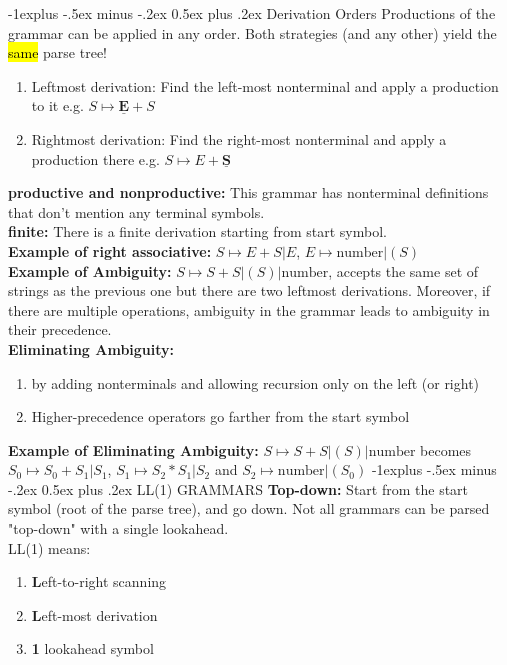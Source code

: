 \documentclass[10pt,landscape]{article}
\makeatletter
\newcommand{\yellow}[1]{\sethlcolor{yellow} \hl{#1}}
\renewcommand{\subsection}{\@startsection{subsection}{2}{0mm}%
                                {-1explus -.5ex minus -.2ex}%
                                {0.5ex plus .2ex}%
                                {\normalfont\normalsize\bfseries}}
\makeatother
\begin{document}
\begin{multicols}{3}
\subsection{Derivation Orders}
Productions of the grammar can be applied in any order. Both strategies (and any other) yield the \yellow{same} parse tree!
\begin{enumerate}
  \item Leftmost derivation: Find the left-most nonterminal and apply a production to it e.g. $S \mapsto \underline{\textbf{E}} + S$
  \item Rightmost derivation: Find the right-most nonterminal and apply a production there e.g. $S \mapsto E + \underline{\textbf{S}}$
\end{enumerate}
\textbf{productive and nonproductive:} This grammar has nonterminal definitions that don't mention any terminal symbols.\\
\textbf{finite:} There is a finite derivation starting from start symbol.\\
\textbf{Example of right associative:} $S \mapsto E + S | E$, $E \mapsto \text{number} | ( S )$ \\
\textbf{Example of Ambiguity:} $S \mapsto S + S | ( S ) | \text{number}$, accepts the same set of strings as the previous one
but there are two leftmost derivations. Moreover, if there are multiple operations, ambiguity in the grammar
leads to ambiguity in their precedence.\\
\textbf{Eliminating Ambiguity:} 
\begin{enumerate}
  \item by adding nonterminals and allowing recursion only on the left (or right)
  \item Higher-precedence operators go farther from the start symbol
\end{enumerate}
\textbf{Example of Eliminating Ambiguity:} $S \mapsto S + S | ( S ) | \text{number}$ becomes $S_0 \mapsto S_0 + S_1 | S_1$, 
$S_1 \mapsto S_2 * S_1 | S_2$ and $S_2 \mapsto \text{number} | ( S_0 )$
\subsection{LL(1) GRAMMARS}
\textbf{Top-down:} Start from the start symbol (root of the parse tree), and go down. Not all grammars can be parsed "top-down" with a single lookahead. \\
LL(1) means:
\begin{enumerate}
  \item \textbf{L}eft-to-right scanning
  \item \textbf{L}eft-most derivation
  \item \textbf{1} lookahead symbol
\end{enumerate}

\end{multicols}
\end{document}
